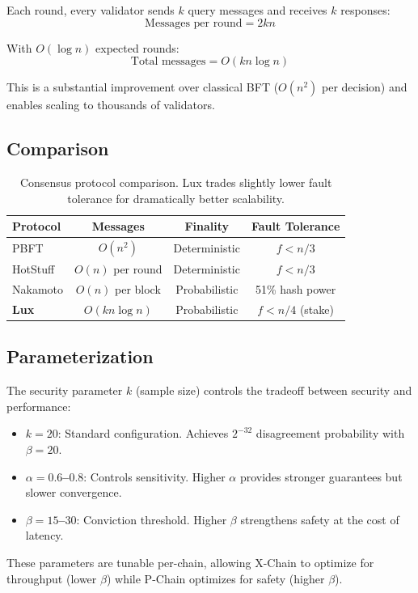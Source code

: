 Each round, every validator sends $k$ query messages and receives $k$ responses:
\begin{equation}
    \text{Messages per round} = 2kn
\end{equation}

With $O(\log n)$ expected rounds:
\begin{equation}
    \text{Total messages} = O(kn \log n)
\end{equation}

This is a substantial improvement over classical BFT ($O(n^2)$ per decision) and enables scaling to thousands of validators.

\subsection{Comparison}

\begin{table}[h]
\centering
\small
\begin{tabular}{@{}lccc@{}}
\toprule
\textbf{Protocol} & \textbf{Messages} & \textbf{Finality} & \textbf{Fault Tolerance} \\
\midrule
PBFT & $O(n^2)$ & Deterministic & $f < n/3$ \\
HotStuff & $O(n)$ per round & Deterministic & $f < n/3$ \\
Nakamoto & $O(n)$ per block & Probabilistic & 51\% hash power \\
\textbf{Lux} & $O(kn\log n)$ & Probabilistic & $f < n/4$ (stake) \\
\bottomrule
\end{tabular}
\caption{Consensus protocol comparison. Lux trades slightly lower fault tolerance for dramatically better scalability.}
\label{tab:comparison}
\end{table}

\subsection{Parameterization}

The security parameter $k$ (sample size) controls the tradeoff between security and performance:

\begin{itemize}
    \item \textbf{$k = 20$}: Standard configuration. Achieves $2^{-32}$ disagreement probability with $\beta = 20$.
    \item \textbf{$\alpha = 0.6$--$0.8$}: Controls sensitivity. Higher $\alpha$ provides stronger guarantees but slower convergence.
    \item \textbf{$\beta = 15$--$30$}: Conviction threshold. Higher $\beta$ strengthens safety at the cost of latency.
\end{itemize}

These parameters are tunable per-chain, allowing X-Chain to optimize for throughput (lower $\beta$) while P-Chain optimizes for safety (higher $\beta$).
